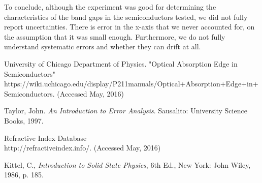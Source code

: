 \documentclass{article}
\begin{document}
To conclude, although the experiment was good for determining the characteristics of the band gaps in the semiconductors tested, we did not fully report uncertainties. There is error in the x-axis that we never accounted for, on the assumption that it was small enough. Furthermore, we do not fully understand systematic errors and whether they can drift at all.

\begin{thebibliography}{10}

		University of Chicago Department of Physics. "Optical Absorption Edge in Semiconductors"\\
		https://wiki.uchicago.edu/display/P211manuals/Optical+Absorption+Edge+in+Semiconductors. (Accessed May, 2016)

		Taylor, John. \emph{An Introduction to Error Analysis}. Sausalito: University Science Books, 1997.
		
		Refractive Index Database\\
		http://refractiveindex.info/. (Accessed May, 2016)
		
		Kittel, C., \emph{Introduction to Solid State Physics}, 6th Ed., New York: John Wiley, 1986, p. 185.
		
\end{thebibliography}
\end{document}
